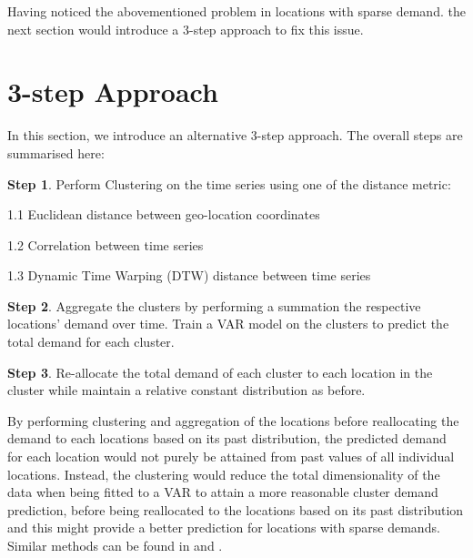 \documentclass[12pt, letterpaper] {article}
\begin{document}
\noindent Having noticed the abovementioned problem in locations with sparse demand. the next section would introduce a 3-step approach to fix this issue. 

\newpage

\section{3-step Approach}

In this section, we introduce an alternative 3-step approach. The overall steps are summarised here:

\noindent \textbf{Step 1}. Perform Clustering on the time series using one of the distance metric: 

	1.1 Euclidean distance between geo-location coordinates
	
	1.2 Correlation between time series 
	
	1.3 Dynamic Time Warping (DTW) distance between time series
	
	
	
\noindent \textbf{Step 2}. Aggregate the clusters by performing a summation the respective locations' demand over time. Train a VAR model on the clusters to predict the total demand for each cluster. 

\noindent \textbf{Step 3}. Re-allocate the total demand of each cluster to each location in the cluster while maintain a relative constant distribution as before.







\noindent By performing clustering and aggregation of the locations before reallocating the demand to each locations based on its past distribution, the predicted demand for each location would not purely be attained from past values of all individual locations. Instead, the clustering would reduce the total dimensionality of the data when being fitted to a VAR to attain a more reasonable cluster demand prediction, before being reallocated to the locations based on its past distribution and this might provide a better prediction for locations with sparse demands. Similar methods can be found in \cite{Paul2015} and \cite{Chi2014}.
\end{document}
